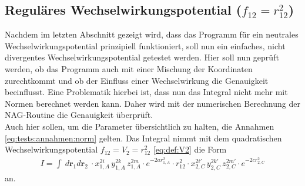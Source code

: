 \subsection{Reguläres Wechselwirkungspotential 
($f_{12}=r_{12}^2$)}\label{sec:T:quad}
%
Nachdem im letzten Abschnitt gezeigt wird, dass das Programm für ein neutrales 
Wechselwirkungspotential prinzipiell funktioniert, soll nun ein einfaches, 
nicht divergentes Wechselwirkungspotential getestet werden. Hier soll nun 
geprüft werden, ob das Programm auch mit einer Mischung der Koordinaten 
zurechtkommt und ob der Einfluss einer Wechselwirkung die Genauigkeit 
beeinflusst.  
Eine Problematik hierbei ist, dass nun das Integral nicht mehr mit Normen 
berechnet werden kann. Daher wird mit der numerischen Berechnung der 
NAG-Routine die Genauigkeit überprüft. \\
Auch hier sollen, um die Parameter übersichtlich zu halten, die Annahmen 
\ref{eq:tests:annahmen:norm} gelten.
Das Integral nimmt mit dem quadratischen Wechselwirkungspotential 
$f_{12}=V_2=r_{12}^2$
\ref{eq:def:V2} die Form
%
\begin{align*}
 I=\int\ d\textbf{r}_1 d\textbf{r}_2\   \cdot 
 x_{1,A}^{2i}\,y_{1,A}^{2k}\,z_{1,A}^{2m}\cdot e^{-2ar_{1,A}^2} \cdot r_{12}^2 
 \cdot x_{2,C}^{2i'}\,y_{2,C}^{2k'}\,z_{2,C}^{2m'} \cdot  e^{-2c 
 r_{2,C}^2}
\end{align*}
%
an. 
%
%
%
